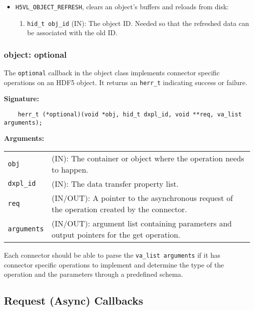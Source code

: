 \begin{itemize}
\item \texttt{H5VL\_OBJECT\_REFRESH}, clears an object's buffers and reloads from disk:
  \begin{enumerate}
  \item \texttt{hid\_t obj\_id} (IN): The object ID. Needed so that the refreshed data can be associated with the old ID. 
  \end{enumerate}
\end{itemize}

\subsubsection{object: optional}
The \texttt{optional} callback in the object class implements connector specific operations on an HDF5 object. It returns an \texttt{herr\_t} indicating success or failure. \bigskip

\begin{mdframed}[style=bgbox]
\textbf{Signature:}
\begin{lstlisting}
    herr_t (*optional)(void *obj, hid_t dxpl_id, void **req, va_list arguments);
\end{lstlisting}

\textbf{Arguments:}\\
\begin{tabular}{l p{13.5cm}}
  \texttt{obj} & (IN): The container or object where the operation needs to happen.\\
  \texttt{dxpl\_id} & (IN): The data transfer property list.\\
  \texttt{req} & (IN/OUT): A pointer to the asynchronous request of the operation created by the connector.\\
  \texttt{arguments} & (IN/OUT): argument list containing parameters and output pointers for the get operation. \\
\end{tabular}
\end{mdframed}

Each connector should be able to parse the \texttt{va\_list arguments} if it has connector specific operations to implement and determine the type of the operation and the parameters through a predefined schema. 


\subsection{Request (Async) Callbacks}

